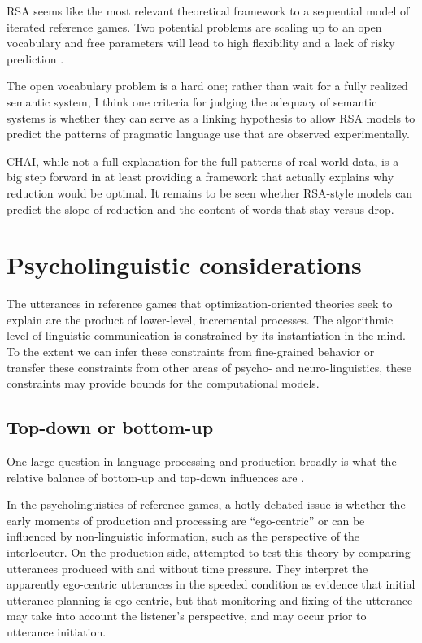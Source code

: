 \documentclass[]{article}
\begin{document}

RSA seems like the most relevant theoretical framework to a sequential model of iterated reference games. Two potential problems are scaling up to an open vocabulary and free parameters will lead to high flexibility and a lack of risky prediction \citep{meehl1990}.

The open vocabulary problem is a hard one; rather than wait for a fully realized semantic system, I think one criteria for judging the adequacy of semantic systems is whether they can serve as a linking hypothesis to allow RSA models to predict the patterns of pragmatic language use that are observed experimentally. 

CHAI, while not a full explanation for the full patterns of real-world data, is a big step forward in at least providing a framework that actually explains why reduction would be optimal. It remains to be seen whether RSA-style models can predict the slope of reduction and the content of words that stay versus drop. 

\section{Psycholinguistic considerations}

The utterances in reference games that optimization-oriented theories seek to explain are the product of lower-level, incremental processes. The algorithmic level of linguistic communication is constrained by its instantiation in the mind. To the extent we can infer these constraints from fine-grained behavior or transfer these constraints from other areas of psycho- and neuro-linguistics, these constraints may provide bounds for the computational models. 


\subsection{Top-down or bottom-up}
One large question in language processing and production broadly is what the relative balance of bottom-up and top-down influences are \citep{gwilliams2022,tanenhaus1995,horton2005, horton1996}. 

In the psycholinguistics of reference games, a hotly debated issue is whether the early moments of production and processing are ``ego-centric'' or can be influenced by non-linguistic information, such as the perspective of the interlocuter. On the production side, \citet{horton1996} attempted to test this theory by comparing utterances produced with and without time pressure. They interpret the apparently ego-centric utterances in the speeded condition as evidence that initial utterance planning is ego-centric, but that monitoring and fixing of the utterance may take into account the listener's perspective, and may occur prior to utterance initiation. 
\end{document}
